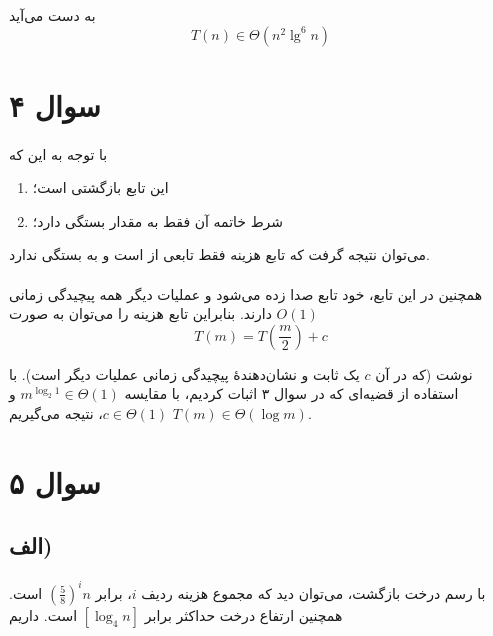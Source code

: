 \documentclass{article}
\begin{document}
	به دست می‌آید
	\begin{equation*}
		T(n) \in \Theta(n^2 \lg^6 n)
	\end{equation*}

	\section*{سوال ۴}
	\paragraph*{}

	با توجه به این که
	\begin{enumerate}
		\item
		این تابع بازگشتی است؛

		\item
		شرط خاتمه آن فقط به مقدار
		بستگی دارد؛
	\end{enumerate}

	می‌توان نتیجه گرفت که تابع هزینه
	فقط تابعی از
	است و به
	بستگی ندارد.

	\paragraph*{}
	همچنین در این تابع، خود تابع صدا زده می‌شود و عملیات دیگر همه پیچیدگی زمانی
	$O(1)$
	دارند. بنابراین تابع هزینه
	را می‌توان به صورت
	\begin{equation*}
		T(m) = T(\frac{m}{2}) + c
	\end{equation*}

	نوشت (که در آن $c$ یک ثابت و نشان‌دهندهٔ پیچیدگی زمانی عملیات دیگر است). با استفاده از قضیه‌ای که در سوال ۳ اثبات کردیم، با مقایسه
	$m^{\log_2 1} \in \Theta(1)$
	و
	$c \in \Theta(1)$،
	نتیجه می‌گیریم
	$T(m) \in \Theta(\log m)$.

	\section*{سوال ۵}
	\subsection*{الف)}
	\paragraph*{}
	با رسم درخت بازگشت، می‌توان دید که
	مجموع هزینه ردیف $i$، برابر
	$\left(\frac{5}{8}\right)^in$
	است. همچنین ارتفاع درخت حداکثر برابر
	$[\log_4 n]$
	است. داریم
\end{document}
